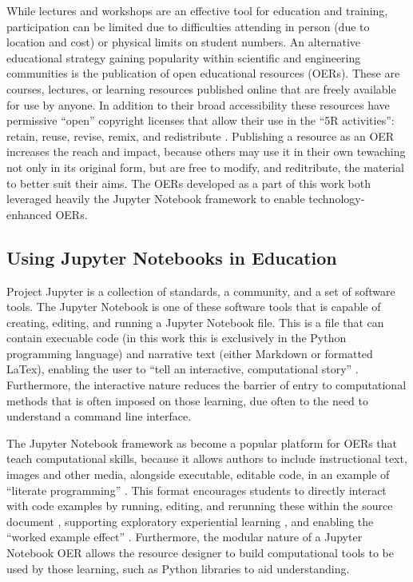 While lectures and workshops are an effective tool for education and training, participation can be limited due to difficulties attending in person (due to location and cost) or physical limits on student numbers.
An alternative educational strategy gaining popularity within scientific and engineering communities is the publication of open educational resources (OERs). These are courses, lectures, or learning resources published online that are freely available for use by anyone.
In addition to their broad accessibility these resources have permissive ``open'' copyright licenses that allow their use in the ``5R activities'': retain, reuse, revise, remix, and redistribute \cite{wiley_open_2018}.
Publishing a resource as an OER increases the reach and impact, because others may use it in their own tewaching not only in its original form, but are free to modify, and reditribute, the material to better suit their aims.
The OERs developed as a part of this work both leveraged heavily the Jupyter Notebook framework \cite{kluyver_jupyter_2016} to enable technology-enhanced OERs.

\subsection{Using Jupyter Notebooks in Education}
Project Jupyter \cite{kluyver_jupyter_2016} is a collection of standards, a community, and a set of software tools.
The Jupyter Notebook is one of these software tools that is capable of creating, editing, and running a Jupyter Notebook file.
This is a file that can contain execuable code (in this work this is exclusively in the Python programming language) and narrative text (either Markdown or formatted LaTex), enabling the user to ``tell an interactive, computational story'' \cite{barba_teaching_2019}.
Furthermore, the interactive nature reduces the barrier of entry to computational methods that is often imposed on those learning, due often to the need to understand a command line interface.

The Jupyter Notebook framework as become a popular platform for OERs that teach computational skills, because it allows authors to include instructional text, images and other media, alongside executable, editable code, in an example of ``literate programming'' \cite{knuth_literate_1984}.
This format encourages students to directly interact with code examples by running, editing, and rerunning these within the source document \cite{barba_cybertraining_2017}, supporting exploratory experiential learning \cite{papert_mindstroms_1993}, and enabling the ``worked example effect'' \cite{tarmizi_guidance_1988}.
Furthermore, the modular nature of a Jupyter Notebook OER allows the resource designer to build computational tools to be used by those learning, such as Python libraries to aid understanding.


